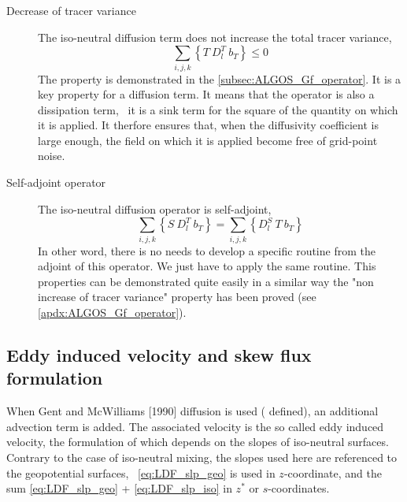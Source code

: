 \documentclass[../main/NEMO_manual]{subfiles}
\begin{document}
\begin{description}
\item [Decrease of tracer variance] The iso-neutral diffusion term does not increase the total tracer variance, \ie
  \[
    \sum_{i,j,k} \left\{ T \ D_l^T \ b_T \right\} \leq 0
  \]
The property is demonstrated in the \autoref{subsec:ALGOS_Gf_operator}.
It is a key property for a diffusion term.
It means that the operator is also a dissipation term,
\ie\ it is a sink term for the square of the quantity on which it is applied.
It therfore ensures that, when the diffusivity coefficient is large enough,
the field on which it is applied become free of grid-point noise.
\item [Self-adjoint operator] The iso-neutral diffusion operator is self-adjoint, \ie
  \[
    \sum_{i,j,k} \left\{ S \ D_l^T \ b_T \right\} = \sum_{i,j,k} \left\{ D_l^S \ T \ b_T \right\}
  \]
In other word, there is no needs to develop a specific routine from the adjoint of this operator.
We just have to apply the same routine.
This properties can be demonstrated quite easily in a similar way the "non increase of tracer variance" property
has been proved (see \autoref{apdx:ALGOS_Gf_operator}).
\end{description}

\subsection{Eddy induced velocity and skew flux formulation}

When Gent and McWilliams [1990] diffusion is used ( defined),
an additional advection term is added.
The associated velocity is the so called eddy induced velocity,
the formulation of which depends on the slopes of iso-neutral surfaces.
Contrary to the case of iso-neutral mixing, the slopes used here are referenced to the geopotential surfaces,
\ie\ \autoref{eq:LDF_slp_geo} is used in $z$-coordinate,
and the sum \autoref{eq:LDF_slp_geo} + \autoref{eq:LDF_slp_iso} in $z^*$ or $s$-coordinates.
\end{document}
